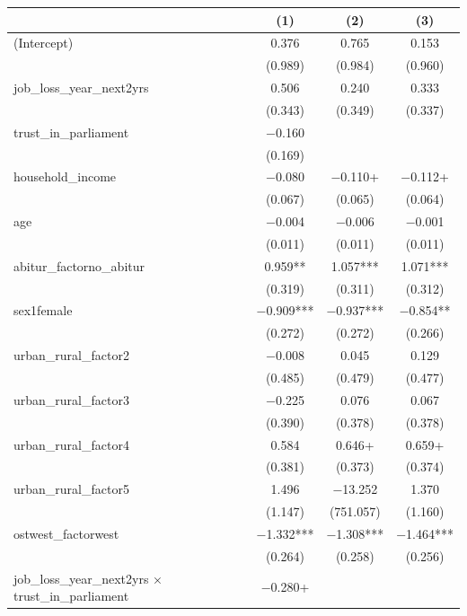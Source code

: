 \documentclass[
]{article}
\begin{document}
\begin{table}
\centering
\begin{tabular}[t]{lccc}
\toprule
  & (1) & (2) & (3)\\
\midrule
(Intercept) & \num{0.376} & \num{0.765} & \num{0.153}\\
 & (\num{0.989}) & (\num{0.984}) & (\num{0.960})\\
job\_loss\_year\_next2yrs & \num{0.506} & \num{0.240} & \num{0.333}\\
 & (\num{0.343}) & (\num{0.349}) & (\num{0.337})\\
trust\_in\_parliament & \num{-0.160} &  & \\
 & (\num{0.169}) &  & \\
household\_income & \num{-0.080} & \num{-0.110}+ & \num{-0.112}+\\
 & (\num{0.067}) & (\num{0.065}) & (\num{0.064})\\
age & \num{-0.004} & \num{-0.006} & \num{-0.001}\\
 & (\num{0.011}) & (\num{0.011}) & (\num{0.011})\\
abitur\_factorno\_abitur & \num{0.959}** & \num{1.057}*** & \num{1.071}***\\
 & (\num{0.319}) & (\num{0.311}) & (\num{0.312})\\
sex1female & \num{-0.909}*** & \num{-0.937}*** & \num{-0.854}**\\
 & (\num{0.272}) & (\num{0.272}) & (\num{0.266})\\
urban\_rural\_factor2 & \num{-0.008} & \num{0.045} & \num{0.129}\\
 & (\num{0.485}) & (\num{0.479}) & (\num{0.477})\\
urban\_rural\_factor3 & \num{-0.225} & \num{0.076} & \num{0.067}\\
 & (\num{0.390}) & (\num{0.378}) & (\num{0.378})\\
urban\_rural\_factor4 & \num{0.584} & \num{0.646}+ & \num{0.659}+\\
 & (\num{0.381}) & (\num{0.373}) & (\num{0.374})\\
urban\_rural\_factor5 & \num{1.496} & \num{-13.252} & \num{1.370}\\
 & (\num{1.147}) & (\num{751.057}) & (\num{1.160})\\
ostwest\_factorwest & \num{-1.332}*** & \num{-1.308}*** & \num{-1.464}***\\
 & (\num{0.264}) & (\num{0.258}) & (\num{0.256})\\
job\_loss\_year\_next2yrs × trust\_in\_parliament & \num{-0.280}+ &  & \\

\end{tabular}
\end{table}
\end{document}
